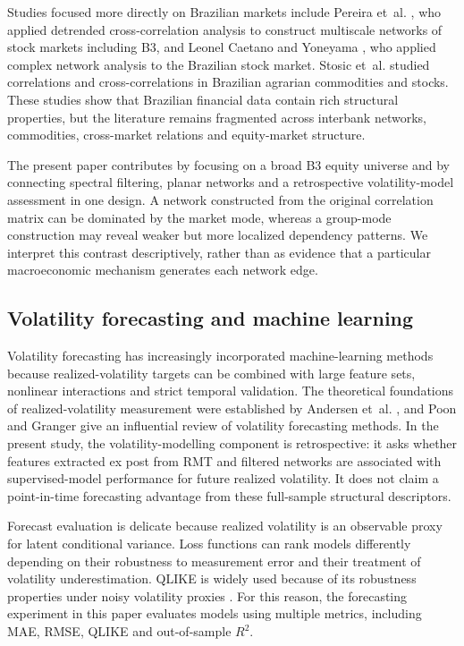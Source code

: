 Studies focused more directly on Brazilian markets include Pereira et~al. \cite{pereira_2019_multiscale}, who applied detrended cross-correlation analysis to construct multiscale networks of stock markets including B3, and Leonel Caetano and Yoneyama \cite{leonel_2022_brazilian}, who applied complex network analysis to the Brazilian stock market. Stosic et~al. \cite{stosic_2015_correlations} studied correlations and cross-correlations in Brazilian agrarian commodities and stocks. These studies show that Brazilian financial data contain rich structural properties, but the literature remains fragmented across interbank networks, commodities, cross-market relations and equity-market structure.

The present paper contributes by focusing on a broad B3 equity universe and by connecting spectral filtering, planar networks and a retrospective volatility-model assessment in one design. A network constructed from the original correlation matrix can be dominated by the market mode, whereas a group-mode construction may reveal weaker but more localized dependency patterns. We interpret this contrast descriptively, rather than as evidence that a particular macroeconomic mechanism generates each network edge.

\subsection{Volatility forecasting and machine learning}

Volatility forecasting has increasingly incorporated machine-learning methods because realized-volatility targets can be combined with large feature sets, nonlinear interactions and strict temporal validation. The theoretical foundations of realized-volatility measurement were established by Andersen et~al. \cite{andersen_2003_modeling}, and Poon and Granger \cite{poon_granger_2003} give an influential review of volatility forecasting methods. In the present study, the volatility-modelling component is retrospective: it asks whether features extracted ex post from RMT and filtered networks are associated with supervised-model performance for future realized volatility. It does not claim a point-in-time forecasting advantage from these full-sample structural descriptors.

Forecast evaluation is delicate because realized volatility is an observable proxy for latent conditional variance. Loss functions can rank models differently depending on their robustness to measurement error and their treatment of volatility underestimation. QLIKE is widely used because of its robustness properties under noisy volatility proxies \cite{patton_2011_volatility}. For this reason, the forecasting experiment in this paper evaluates models using multiple metrics, including MAE, RMSE, QLIKE and out-of-sample $R^2$.


